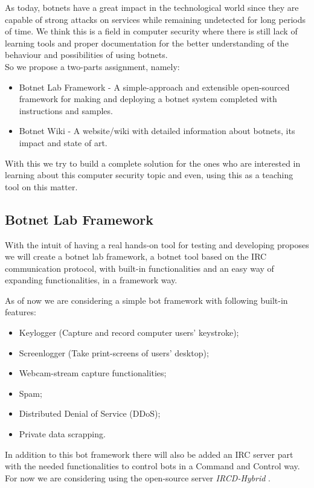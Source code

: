 \documentclass[]{article}
\begin{document}
As today, botnets have a great impact in the technological world since they are capable of strong attacks on services while remaining undetected for long periods of time. We think this is a field in computer security where there is still lack of learning tools and proper documentation for the better understanding of the behaviour and possibilities of using botnets.\\

So we propose a two-parts assignment, namely:
\begin{itemize}
	\item Botnet Lab Framework - A simple-approach and extensible open-sourced framework for making and deploying a botnet system completed with instructions and samples.
	\item Botnet Wiki - A website/wiki with detailed information about botnets, its impact and state of art.
\end{itemize}

With this we try to build a complete solution for the ones who are interested in learning about this computer security topic and even, using this as a teaching tool on this matter.

\subsection{Botnet Lab Framework}

With the intuit of having a real hands-on tool for testing and developing proposes we will create a botnet lab framework, a botnet tool based on the IRC communication protocol, with built-in functionalities and an easy way of expanding functionalities, in a framework way.

As of now we are considering a simple bot framework with following built-in features:

\begin{itemize}
	\item Keylogger (Capture and record computer users' keystroke);
	\item Screenlogger (Take print-screens of users' desktop);
	\item Webcam-stream capture functionalities;
	\item Spam;
	\item Distributed Denial of Service (DDoS);
	\item Private data scrapping.
\end{itemize}

In addition to this bot framework there will also be added an IRC server part with the needed functionalities to control bots in a Command and Control way. For now we are considering using the open-source server \textit{IRCD-Hybrid} \cite{app:ircdhybrid}.
\end{document}
